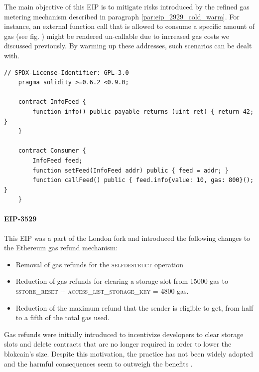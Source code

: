 The main objective of this EIP is to mitigate risks introduced by the refined gas metering mechanism described in paragraph \ref{par:eip_2929_cold_warm}. For instance, an external function call that is allowed to consume a specific amount of gas (see fig. ) might be rendered un-callable due to increased gas costs we discussed previously. By warming up these addresses, such scenarios can be dealt with. 

\begin{lstlisting}[language=Solidity, label={code: external_function_call}, abovecaptionskip=0pt, caption={Example of an external function call with specified gas.}, captionpos=b]
    // SPDX-License-Identifier: GPL-3.0
    pragma solidity >=0.6.2 <0.9.0;
    
    contract InfoFeed {
        function info() public payable returns (uint ret) { return 42; }
    }
    
    contract Consumer {
        InfoFeed feed;
        function setFeed(InfoFeed addr) public { feed = addr; }
        function callFeed() public { feed.info{value: 10, gas: 800}(); }
    }
\end{lstlisting}


\paragraph{EIP-3529}\label{par:eip_3529_refund}
This EIP \citep{buterin_eip_3529} was a part of the London fork and introduced the following changes to the Ethereum gas refund mechanism:

\begin{itemize}
  \item Removal of gas refunds for the \textsc{selfdestruct} operation
  \item Reduction of gas refunds for clearing a storage slot from 15000 gas to \\ \textsc{sstore\_reset + access\_list\_storage\_key = 4800} gas.
  \item Reduction of the maximum refund that the sender is eligible to get, from half to a fifth of the total gas used.
\end{itemize}

Gas refunds were initially introduced to incentivize developers to clear storage slots and delete contracts that are no longer required in order to lower the blokcain's size. Despite this motivation, the practice has not been widely adopted and the harmful consequences seem to outweigh the benefits \citep{buterin_eip_3529}.

